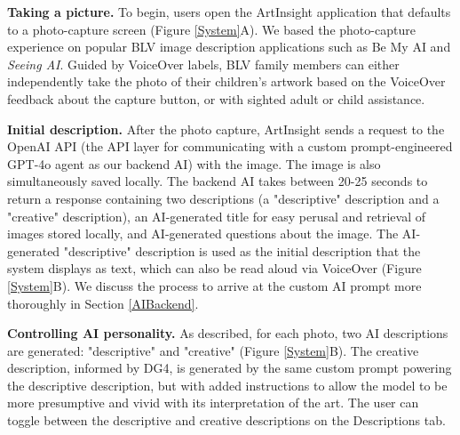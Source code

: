 \documentclass[sigconf]{acmart}
\begin{document}
\textbf{Taking a picture.} To begin, users open the ArtInsight application that defaults to a photo-capture screen (Figure \ref{System}A). We based the photo-capture experience on popular BLV image description applications such as Be My AI and \textit{Seeing AI}. Guided by VoiceOver labels, BLV family members can either independently take the photo of their children's artwork based on the VoiceOver feedback about the capture button, or with sighted adult or child assistance.

\textbf{Initial description.} After the photo capture, ArtInsight sends a request to the OpenAI API \cite{openai_assistants} (the API layer for communicating with a custom prompt-engineered GPT-4o agent as our backend AI) with the image. The image is also simultaneously saved locally. The backend AI takes between 20-25 seconds to return a response containing two descriptions (a "descriptive" description and a "creative" description), an AI-generated title for easy perusal and retrieval of images stored locally, and AI-generated questions about the image. The AI-generated "descriptive" description is used as the initial description that the system displays as text, which can also be read aloud via VoiceOver (Figure \ref{System}B). We discuss the process to arrive at the custom AI prompt more thoroughly in Section \ref{AIBackend}.

\textbf{Controlling AI personality.} As described, for each photo, two AI descriptions are generated: "descriptive" and "creative" (Figure \ref{System}B). The creative description, informed by DG4, is generated by the same custom prompt powering the descriptive description, but with added instructions to allow the model to be more presumptive and vivid with its interpretation of the art. The user can toggle between the descriptive and creative descriptions on the Descriptions tab.
\end{document}
